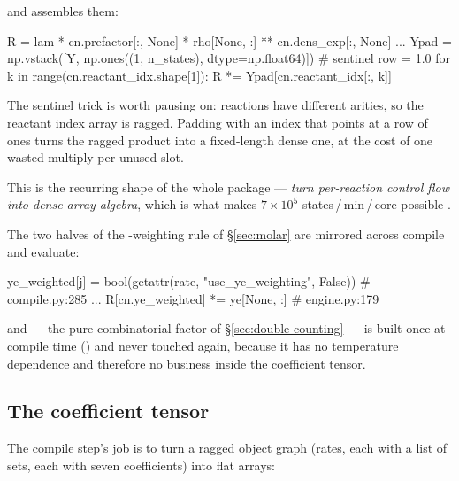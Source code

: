 and  assembles them:

\begin{srclisting}
R = lam * cn.prefactor[:, None] * rho[None, :] ** cn.dens_exp[:, None]
...
Ypad = np.vstack([Y, np.ones((1, n_states), dtype=np.float64)])  # sentinel row = 1.0
for k in range(cn.reactant_idx.shape[1]):
    R *= Ypad[cn.reactant_idx[:, k]]
\end{srclisting}

The sentinel trick is worth pausing on: reactions have different arities, so the
reactant index array is ragged. Padding with an index that points at a row of
ones turns the ragged product into a fixed-length dense one, at the cost of one
wasted multiply per unused slot.

\begin{result}
This is the recurring shape of the whole  package --- \emph{turn
per-reaction control flow into dense array algebra}, which is what makes
$7\times10^5$ states\,/\,min\,/\,core possible .
\end{result}

The two halves of the \Ye-weighting rule of \S\ref{sec:molar} are mirrored
across compile and evaluate:

\begin{srclisting}
ye_weighted[j] = bool(getattr(rate, "use_ye_weighting", False))   # compile.py:285
...
R[cn.ye_weighted] *= ye[None, :]                                  # engine.py:179
\end{srclisting}

and  --- the pure combinatorial factor of
\S\ref{sec:double-counting} --- is built once at compile time
() and never touched again, because it has no
temperature dependence and therefore no business inside the coefficient tensor.

\subsection{The coefficient tensor}
\label{sec:coefftensor}

The compile step's job is to turn a ragged object graph (rates, each with a list
of sets, each with seven coefficients) into flat arrays:


